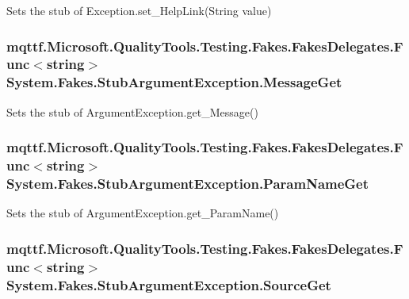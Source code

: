 Sets the stub of Exception.\-set\-\_\-\-Help\-Link(\-String value)

\hypertarget{class_system_1_1_fakes_1_1_stub_argument_exception_a9b290b6f78787650f5aa3450def57108}{
\subsubsection[{Message\-Get}]{\setlength{\rightskip}{0pt plus 5cm}mqttf.\-Microsoft.\-Quality\-Tools.\-Testing.\-Fakes.\-Fakes\-Delegates.\-Func$<$string$>$ System.\-Fakes.\-Stub\-Argument\-Exception.\-Message\-Get}}\label{class_system_1_1_fakes_1_1_stub_argument_exception_a9b290b6f78787650f5aa3450def57108}


Sets the stub of Argument\-Exception.\-get\-\_\-\-Message()

\hypertarget{class_system_1_1_fakes_1_1_stub_argument_exception_ae653a743f3e28b0f8f0c011477c04cff}{
\subsubsection[{Param\-Name\-Get}]{\setlength{\rightskip}{0pt plus 5cm}mqttf.\-Microsoft.\-Quality\-Tools.\-Testing.\-Fakes.\-Fakes\-Delegates.\-Func$<$string$>$ System.\-Fakes.\-Stub\-Argument\-Exception.\-Param\-Name\-Get}}\label{class_system_1_1_fakes_1_1_stub_argument_exception_ae653a743f3e28b0f8f0c011477c04cff}


Sets the stub of Argument\-Exception.\-get\-\_\-\-Param\-Name()

\hypertarget{class_system_1_1_fakes_1_1_stub_argument_exception_a36e6b5a5a482bf8a803657978990cdce}{
\subsubsection[{Source\-Get}]{\setlength{\rightskip}{0pt plus 5cm}mqttf.\-Microsoft.\-Quality\-Tools.\-Testing.\-Fakes.\-Fakes\-Delegates.\-Func$<$string$>$ System.\-Fakes.\-Stub\-Argument\-Exception.\-Source\-Get}}\label{class_system_1_1_fakes_1_1_stub_argument_exception_a36e6b5a5a482bf8a803657978990cdce}


